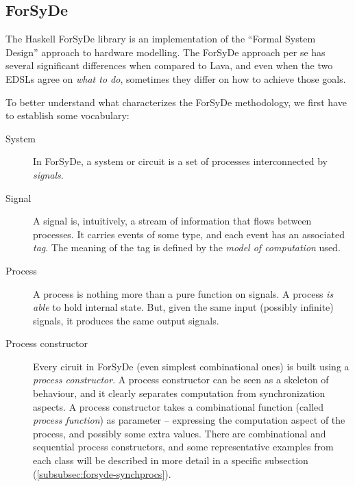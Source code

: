 \documentclass[a4paper]{article}
\begin{document}
        \subsection{ForSyDe}
        \label{subsec:forsyde}
            The Haskell ForSyDe library is an implementation of the ``Formal System Design''
            approach to hardware modelling\cite{forsyde1999}. The ForSyDe approach per se has
            several significant differences when compared to Lava, and even when the two EDSLs agree
            on \emph{what to do}, sometimes they differ on how to achieve those goals.

            To better understand what characterizes the ForSyDe methodology, we first have to
            establish some vocabulary:

            \begin{description}
                \item[System] In ForSyDe, a system or circuit is a set of processes interconnected
                    by \emph{signals}.

                \item[Signal] A signal is, intuitively, a stream of information that flows between
                    processes. It carries events of some type, and each event has an associated
                    \emph{tag}. The meaning of the tag is defined by the \emph{model of
                        computation} used.

                \item[Process] A process is nothing more than a pure function on signals. A process
                    \emph{is able} to hold internal state. But, given the same input (possibly
                    infinite) signals, it produces the same output signals.

                \item[Process constructor] Every ciruit in ForSyDe (even simplest combinational ones)
                    is built using a \emph{process constructor}. A process constructor can be seen as
                    a skeleton of behaviour, and it clearly separates computation from
                    synchronization aspects. A process constructor takes a combinational function
                    (called \emph{process function}) as parameter -- expressing the computation
                    aspect of the process, and possibly some extra values. There are combinational
                    and sequential process constructors, and some representative examples from each
                    class will be described in more detail in a specific subsection
                    (\ref{subsubsec:forsyde-synchprocs}).
            \end{description}
\end{document}
